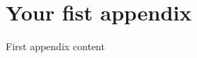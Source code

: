 \documentclass[12pt]{UIdahoMastersThesis}
\begin{document}
\chapter{Your fist appendix}
First appendix content

% 

% 
\end{document}
